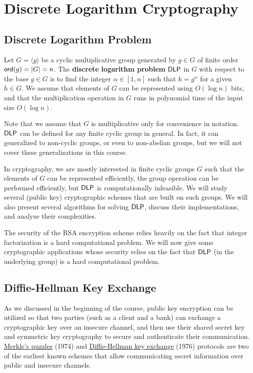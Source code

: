 \section{Discrete Logarithm Cryptography}

\subsection{Discrete Logarithm Problem}
Let $G = \langle g \rangle$ be a cyclic multiplicative group generated by 
$g \in G$ of finite order ${\sf ord}(g) = |G| = n$. The {\bf discrete logarithm 
problem} ${\sf DLP}$ in $G$ with respect to the base $g \in G$ is to find the integer 
$\alpha \in [1, n]$ such that $h = g^\alpha$ for a given $h \in G$. We assume 
that elements of $G$ can be represented using $O(\log n)$ bits, and that the 
multiplication operation in $G$ runs in polynomial time of the input size 
$O(\log n)$. 

Note that we assume that $G$ is multiplicative only for convenience in notation. 
${\sf DLP}$ can be defined for any finite cyclic group in general. In fact, it 
can generalized to non-cyclic groups, or even to non-abelian groups, but we will 
not cover these generalizations in this course. 

In cryptography, we are mostly interested in finite cyclic groups $G$ such that 
the elements of $G$ can be represented efficiently, the group operation can be 
performed efficiently, but ${\sf DLP}$ is computationally infeasible. We will study 
several (public key) cryptographic schemes that are built on such groups. We 
will also present several algorithms for solving ${\sf DLP}$, discuss their 
implementations, and analyze their complexities. 

The security of the RSA encryption scheme relies heavily on the fact that integer 
factorization is a hard computational problem. We will now give some cryptographic
applications whose security relies on the fact that ${\sf DLP}$ (in the underlying 
group) is a hard computational problem. 

\subsection{Diffie-Hellman Key Exchange}
As we discussed in the beginning of the course, public key encryption can be 
utilized so that two parties (such as a client and a bank) can exchange a 
cryptographic key over an insecure channel, and then use their shared secret 
key and symmetric key cryptography to secure and authenticate their communication. 
\href{https://en.wikipedia.org/wiki/Merkle%27s_Puzzles}{Merkle's puzzles} (1974) 
and \href{https://en.wikipedia.org/wiki/Diffie%E2%80%93Hellman_key_exchange}
{Diffie-Hellman key exchange} (1976) protocols are two of the earliest known 
schemes that allow communicating secret information over public and insecure 
channels. 

